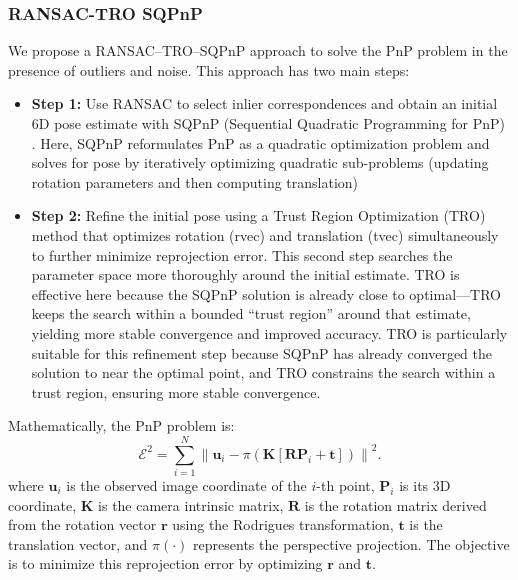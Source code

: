 \documentclass[a4paper,fleqn]{cas-sc}
\begin{document}
\subsubsection{RANSAC-TRO SQPnP}
We propose a RANSAC–TRO–SQPnP approach to solve the PnP problem in the presence of outliers and noise. This approach has two main steps:

\begin{itemize}
	\item \textbf{Step 1:} Use RANSAC to select inlier correspondences and obtain an initial 6D pose estimate with SQPnP (Sequential Quadratic Programming for PnP) \citep{terzakis2020consistently}. Here, SQPnP reformulates PnP as a quadratic optimization problem and solves for pose by iteratively optimizing quadratic sub-problems (updating rotation parameters and then computing translation)
	\item \textbf{Step 2:} Refine the initial pose using a Trust Region Optimization (TRO) method that optimizes rotation (rvec) and translation (tvec) simultaneously to further minimize reprojection error. This second step searches the parameter space more thoroughly around the initial estimate. TRO is effective here because the SQPnP solution is already close to optimal—TRO keeps the search within a bounded “trust region” around that estimate, yielding more stable convergence and improved accuracy. TRO is particularly suitable for this refinement step because SQPnP has already converged the solution to near the optimal point, and TRO constrains the search within a trust region, ensuring more stable convergence.
\end{itemize}

Mathematically, the PnP problem is:
\begin{equation}
	\mathcal{E}^2 = \sum_{i=1}^{N} \left\lVert \mathbf{u}_i - \pi\left(\mathbf{K} \left[ \mathbf{R} \mathbf{P}_i + \mathbf{t} \right] \right) \right\rVert^2.
\end{equation}
where $\mathbf{u}_i$ is the observed image coordinate of the $i$-th point, $\mathbf{P}_i$ is its 3D coordinate, $\mathbf{K}$ is the camera intrinsic matrix, $\mathbf{R}$ is the rotation matrix derived from the rotation vector $\mathbf{r}$ using the Rodrigues transformation, $\mathbf{t}$ is the translation vector, and $\pi(\cdot)$ represents the perspective projection. The objective is to minimize this reprojection error by optimizing $\mathbf{r}$ and $\mathbf{t}$. 
\end{document}
